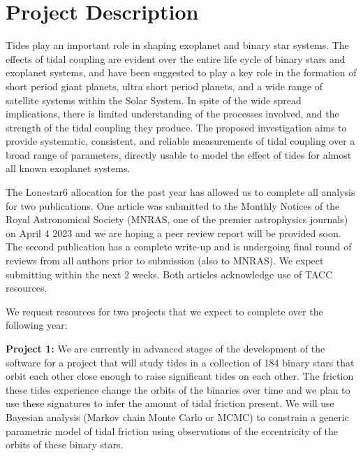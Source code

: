 \documentclass[12pt]{article}
\begin{document}
\maketitle

\vspace{-15mm}

\section{Project Description}

Tides play an important role in shaping exoplanet and binary star systems. The
effects of tidal coupling are evident over the entire life cycle of binary stars
and exoplanet systems, and have been suggested to play a key role in the
formation of short period giant planets, ultra short period planets, and a wide
range of satellite systems within the Solar System. In spite of the wide spread
implications, there is limited understanding of the processes involved, and the
strength of the tidal coupling they produce. The proposed investigation aims to
provide systematic, consistent, and reliable measurements of tidal coupling over
a broad range of parameters, directly usable to model the effect of tides for
almost all known exoplanet systems.

The Lonestar6 allocation for the past year has allowed us to complete all
analysis for two publications. One article was submitted to the Monthly Notices
of the Royal Astronomical Society (MNRAS, one of the premier astrophysics
journals) on April 4 2023 and we are hoping a peer review report will be
provided soon. The second publication has a complete write-up and is undergoing
final round of reviews from all authors prior to submission (also to MNRAS). We
expect submitting within the next 2 weeks. Both articles acknowledge use of TACC
resources.

We request resources for two projects that we expect to complete over the
following year:

\textbf{Project 1:} We are currently in advanced stages of the development of
the software for a project that will study tides in a collection of 184 binary
stars that orbit each other close enough to raise significant tides on each
other. The friction these tides experience change the orbits of the binaries
over time and we plan to use these signatures to infer the amount of tidal
friction present.  We will use Bayesian analysis (Markov chain Monte Carlo or
MCMC) to constrain a generic parametric model of tidal friction using
observations of the eccentricity of the orbits of these binary stars.
\end{document}
